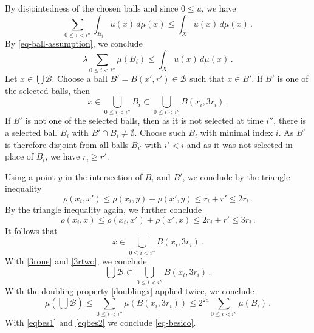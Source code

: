 By disjointedness of the chosen balls and since $0 \le u$, we have
\begin{equation}
\sum_{0\le i<i''}\int_{B_i} u(x)\, d\mu(x) \le \int_X u(x)\, d\mu(x)\, .
\end{equation}
By \eqref{eq-ball-assumption}, we conclude
\begin{equation}\label{eqbes1}
\lambda \sum_{0\le i<i''}\mu(B_i)
\le \int_X u(x)\, d\mu(x)\, .
\end{equation}
Let $x\in \bigcup \mathcal{B}$.
Choose a ball $B'=B(x',r')\in \mathcal{B}$
such that $x\in B'$.
If $B'$ is one of the selected balls, then
\begin{equation}\label{3rone}
    x\in \bigcup _{0\le i< i''}B_i\subset \bigcup _{0\le i< i''}B(x_i,3r_i)\, .
\end{equation}
If $B'$ is not one of the selected balls, then as it is not selected at time $i''$, there is a selected ball $B_i$ with
$B'\cap B_i\neq \emptyset$.
Choose such $B_i$ with minimal index $i$. As $B'$ is therefore disjoint from all
balls $B_{i'}$ with $i'<i$ and
as it was not selected in place of $B_i$, we have $r_i\ge r'$.

Using a point $y$ in the intersection of $B_i$ and $B'$,
we conclude by the triangle inequality
\begin{equation}
   \rho(x_i,x')\le \rho(x_i,y)+\rho(x',y)\le r_i+r'\le 2r_i \, .
\end{equation}
By the triangle inequality again, we further conclude
\begin{equation}
   \rho(x_i,x)\le \rho(x_i,x')+\rho(x',x)\le 2r_i+r'\le 3r_i \, .
\end{equation}
It follows that
\begin{equation}\label{3rtwo}
    x\in \bigcup _{0\le i< i''}B(x_i,3r_i)\, .
\end{equation}
With \eqref{3rone} and \eqref{3rtwo}, we conclude
\begin{equation}
\bigcup \mathcal{B}\subset
\bigcup _{0\le i< i''}B(x_i,3r_i)\, .
\end{equation}
With the doubling property
\eqref{doublingx} applied twice, we conclude
\begin{equation}\label{eqbes2}
    \mu(\bigcup{\mathcal{B}})
    \le \sum _{0\le i< i''}\mu (B(x_i,3r_i))
    \le 2^{2a}\sum _{0\le i< i''}\mu (B_i)\, .
\end{equation}
With \eqref{eqbes1} and \eqref{eqbes2} we conclude
\eqref{eq-besico}.


